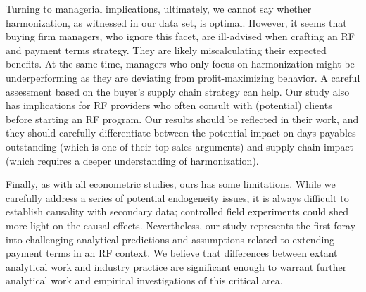 \documentclass[A4,11pt]{article}
\renewcommand{\~}[1]{\tilde{#1}}
\renewcommand{\-}[1]{\overline{#1}}
\def\bibsep{\smallskipamount}%
\begin{document}
Turning to managerial implications, ultimately, we cannot say whether harmonization, as witnessed in our data set, is optimal. However, it seems that buying firm managers, who ignore this facet, are ill-advised when crafting an RF and payment terms strategy. They are likely miscalculating their expected benefits. At the same time, managers who only focus on harmonization might be underperforming as they are deviating from profit-maximizing behavior. A careful assessment based on the buyer's supply chain strategy can help. Our study also has implications for RF providers who often consult with (potential) clients before starting an RF program. Our results should be reflected in their work, and they should carefully differentiate between the potential impact on days payables outstanding (which is one of their top-sales arguments) and supply chain impact (which requires a deeper understanding of harmonization). 

Finally, as with all econometric studies, ours has some limitations. While we carefully address a series of potential endogeneity issues, it is always difficult to establish causality with secondary data; controlled field experiments could shed more light on the causal effects. Nevertheless, our study represents the first foray into challenging analytical predictions and assumptions related to extending payment terms in an RF context. We believe that differences between extant analytical work and industry practice are significant enough to warrant further analytical work and empirical investigations of this critical area.


\setlength{\bibsep}{0pt plus 0.3ex}
\end{document}
